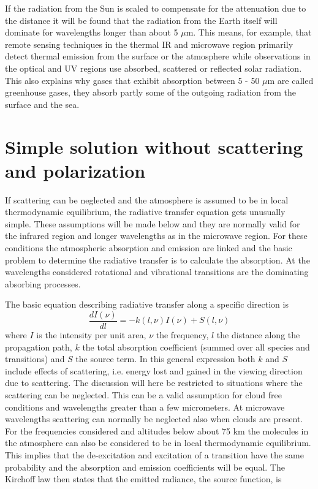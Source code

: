  If the radiation from the Sun is scaled to compensate for the
 attenuation due to the distance it will be found that the radiation
 from the Earth itself will dominate for wavelengths longer than about
 5 $\mu$m. This means, for example, that remote sensing techniques in
 the thermal IR and microwave region primarily detect thermal emission
 from the surface or the atmosphere while observations in the optical
 and UV regions use absorbed, scattered or reflected solar radiation.
 This also explains why gases that exhibit absorption between 5 - 50
 $\mu$m are called greenhouse gases, they absorb partly some of the
 outgoing radiation from the surface and the sea.

\section{Simple solution without scattering and polarization}

 If scattering can be neglected and the atmosphere is assumed to be in
 local thermodynamic equilibrium, the radiative transfer equation gets
 unusually simple. These assumptions will be made below and
 they are normally valid for the infrared region and longer
 wavelengths as in the microwave region. For these conditions the
 atmospheric absorption and emission are linked and the basic problem
 to determine the radiative transfer is to calculate the absorption.
 At the wavelengths considered rotational and vibrational transitions
 are the dominating absorbing processes.

 The basic equation describing radiative transfer along a specific 
 direction is
 \begin{equation}
   \frac{dI(\nu)}{dl} = -k(l,\nu)I(\nu) + S(l,\nu)
  \label{eq:rtetheory:chand}
 \end{equation} 
 where $I$ is the intensity per unit area, $\nu$ the frequency, $l$
 the distance along the propagation path, $k$ the total absorption
 coefficient (summed over all species and transitions) and $S$ the
 source term. In this general expression both $k$ and $S$ include
 effects of scattering, i.e. energy lost and gained in the viewing
 direction due to scattering. The discussion will here be restricted
 to situations where the scattering can be neglected. This can be a
 valid assumption for cloud free conditions and wavelengths greater
 than a few micrometers. At microwave wavelengths scattering can
 normally be neglected also when clouds are present. For the
 frequencies considered and altitudes below about 75 km the molecules
 in the atmosphere can also be considered to be in local thermodynamic
 equilibrium. This implies that the de-excitation and excitation of a
 transition have the same probability and the absorption and emission
 coefficients will be equal.  The Kirchoff law then states that the
 emitted radiance, the source function, is

